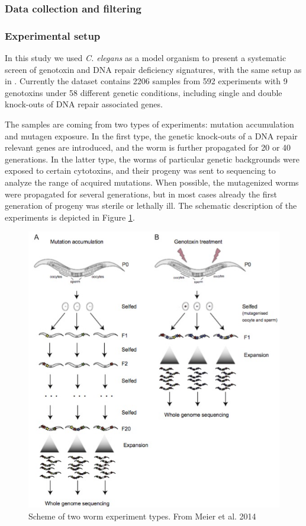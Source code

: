 \subsubsection{Data collection and filtering}

\subsubsection*{Experimental setup}

In this study we used \textit{C. elegans} as a model organism to present a systematic screen of genotoxin and DNA repair deficiency signatures, with the same setup as in  \cite{Meier1}. Currently the dataset contains 2206 samples from 592 experiments with 9 genotoxins under 58 different genetic conditions, including single and double knock-outs of DNA repair associated genes. 

The samples are coming from two types of experiments: mutation accumulation and mutagen exposure. In the first type, the genetic knock-outs of a DNA repair relevant genes are introduced, and the worm is further propagated for 20 or 40 generations. In the latter type, the worms of particular genetic backgrounds were exposed to certain cytotoxins, and their progeny was sent to sequencing to analyze the range of acquired mutations. When possible, the mutagenized worms were propagated for several generations, but in most cases already the first generation of progeny was sterile or lethally ill. The schematic description of the experiments is depicted in Figure \ref{exp_types}.

\begin{figure}
  \centering
  \centerline{\includegraphics[scale=0.7]{two_exp_types.jpg}}
  \caption{Scheme of two worm experiment types. From Meier et al. 2014 \cite{Meier2}}
  \label{exp_types}
\end{figure}

